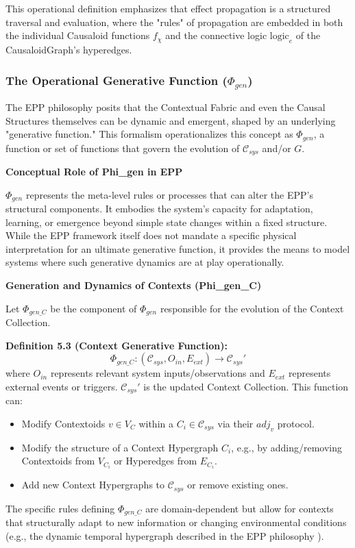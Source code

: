     This operational definition emphasizes that effect propagation is a structured traversal and evaluation, where the "rules" of propagation are embedded in both the individual Causaloid functions \(f_\chi\) and the connective logic \(\text{logic}_e\) of the CausaloidGraph's hyperedges.

    


\subsubsection[The Operational Generative Function (Phi\_gen)]{The Operational Generative Function (\(\Phi_{gen}\))}
    \label{ssec:generative_function_formal_merged} %

    The EPP philosophy posits that the Contextual Fabric and even the Causal Structures themselves can be dynamic and emergent, shaped by an underlying "generative function." This formalism operationalizes this concept as \(\Phi_{gen}\), a function or set of functions that govern the evolution of \(\mathcal{C}_{sys}\) and/or \(G\).


\textbf{Conceptual Role of Phi\_gen in EPP}

        
        \(\Phi_{gen}\) represents the meta-level rules or processes that can alter the EPP's structural components. It embodies the system's capacity for adaptation, learning, or emergence beyond simple state changes within a fixed structure. While the EPP framework itself does not mandate a specific physical interpretation for an ultimate generative function, it provides the means to model systems where such generative dynamics are at play operationally.

        
\textbf{Generation and Dynamics of Contexts (Phi\_gen\_C)}
  
        
        Let \(\Phi_{gen\_C}\) be the component of \(\Phi_{gen}\) responsible for the evolution of the Context Collection.
        
        \textbf{Definition 5.3 (Context Generative Function):}
        \[ \Phi_{gen\_C} : (\mathcal{C}_{sys}, O_{in}, E_{ext}) \to \mathcal{C}_{sys}' \]
        where \(O_{in}\) represents relevant system inputs/observations and \(E_{ext}\) represents external events or triggers. \(\mathcal{C}_{sys}'\) is the updated Context Collection.
        This function can:
        \begin{itemize}
            \item Modify Contextoids \(v \in V_C\) within a \(C_i \in \mathcal{C}_{sys}\) via their \(adj_v\) protocol.
            \item Modify the structure of a Context Hypergraph \(C_i\), e.g., by adding/removing Contextoids from \(V_{C_i}\) or Hyperedges from \(E_{C_i}\).
            \item Add new Context Hypergraphs to \(\mathcal{C}_{sys}\) or remove existing ones.
        \end{itemize}
        The specific rules defining \(\Phi_{gen\_C}\) are domain-dependent but allow for contexts that structurally adapt to new information or changing environmental conditions (e.g., the dynamic temporal hypergraph described in the EPP philosophy \cite{Hansen2025EPP}).


